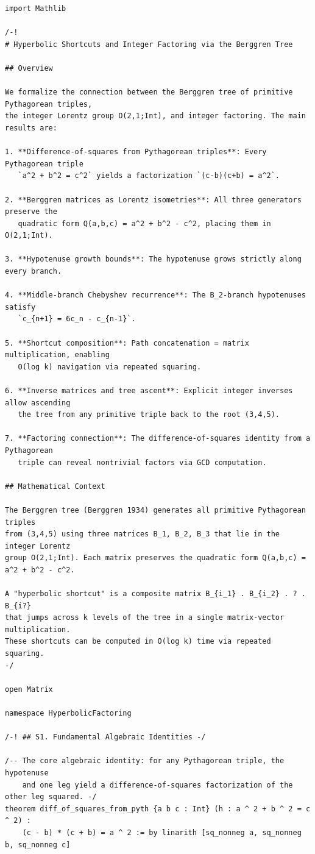 \documentclass[11pt,openright,twoside]{book}
\theoremstyle{definition}
\begin{document}
\begin{lstlisting}[style=lean]
import Mathlib

/-!
# Hyperbolic Shortcuts and Integer Factoring via the Berggren Tree

## Overview

We formalize the connection between the Berggren tree of primitive Pythagorean triples,
the integer Lorentz group O(2,1;Int), and integer factoring. The main results are:

1. **Difference-of-squares from Pythagorean triples**: Every Pythagorean triple
   `a^2 + b^2 = c^2` yields a factorization `(c-b)(c+b) = a^2`.

2. **Berggren matrices as Lorentz isometries**: All three generators preserve the
   quadratic form Q(a,b,c) = a^2 + b^2 - c^2, placing them in O(2,1;Int).

3. **Hypotenuse growth bounds**: The hypotenuse grows strictly along every branch.

4. **Middle-branch Chebyshev recurrence**: The B_2-branch hypotenuses satisfy
   `c_{n+1} = 6c_n - c_{n-1}`.

5. **Shortcut composition**: Path concatenation = matrix multiplication, enabling
   O(log k) navigation via repeated squaring.

6. **Inverse matrices and tree ascent**: Explicit integer inverses allow ascending
   the tree from any primitive triple back to the root (3,4,5).

7. **Factoring connection**: The difference-of-squares identity from a Pythagorean
   triple can reveal nontrivial factors via GCD computation.

## Mathematical Context

The Berggren tree (Berggren 1934) generates all primitive Pythagorean triples
from (3,4,5) using three matrices B_1, B_2, B_3 that lie in the integer Lorentz
group O(2,1;Int). Each matrix preserves the quadratic form Q(a,b,c) = a^2 + b^2 - c^2.

A "hyperbolic shortcut" is a composite matrix B_{i_1} . B_{i_2} . ? . B_{i?}
that jumps across k levels of the tree in a single matrix-vector multiplication.
These shortcuts can be computed in O(log k) time via repeated squaring.
-/

open Matrix

namespace HyperbolicFactoring

/-! ## S1. Fundamental Algebraic Identities -/

/-- The core algebraic identity: for any Pythagorean triple, the hypotenuse
    and one leg yield a difference-of-squares factorization of the other leg squared. -/
theorem diff_of_squares_from_pyth {a b c : Int} (h : a ^ 2 + b ^ 2 = c ^ 2) :
    (c - b) * (c + b) = a ^ 2 := by linarith [sq_nonneg a, sq_nonneg b, sq_nonneg c]


\end{lstlisting}
\end{document}
